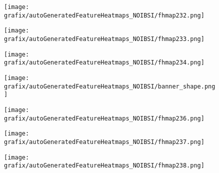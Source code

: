 \hspace{\hsp} 
\begin{subfigure}{\wid\textwidth} 
    \centering 
    \caption{\tiny \sffamily {}} 
    \vspace{\vsp} 
    \texttt{[image: grafix/autoGeneratedFeatureHeatmaps\_NOIBSI/fhmap232.png]} 
\end{subfigure} 
\hspace{\hsp} 
\begin{subfigure}{\wid\textwidth} 
    \centering 
    \caption{\tiny \sffamily {}} 
    \vspace{\vsp} 
    \texttt{[image: grafix/autoGeneratedFeatureHeatmaps\_NOIBSI/fhmap233.png]} 
\end{subfigure} 
\hspace{\hsp} 
\begin{subfigure}{\wid\textwidth} 
    \centering 
    \caption{\tiny \sffamily {}} 
    \vspace{\vsp} 
    \texttt{[image: grafix/autoGeneratedFeatureHeatmaps\_NOIBSI/fhmap234.png]} 
\end{subfigure} 
\hspace{\hsp} 
\begin{subfigure}{\wid\textwidth} 
    \texttt{[image: grafix/autoGeneratedFeatureHeatmaps\_NOIBSI/banner\_shape.png]} 
\end{subfigure} 
\hspace{\hsp} 
\begin{subfigure}{\wid\textwidth} 
    \centering 
    \caption{\tiny \sffamily {}} 
    \vspace{\vsp} 
    \texttt{[image: grafix/autoGeneratedFeatureHeatmaps\_NOIBSI/fhmap236.png]} 
\end{subfigure} 
\hspace{\hsp} 
\begin{subfigure}{\wid\textwidth} 
    \centering 
    \caption{\tiny \sffamily {}} 
    \vspace{\vsp} 
    \texttt{[image: grafix/autoGeneratedFeatureHeatmaps\_NOIBSI/fhmap237.png]} 
\end{subfigure} 
\hspace{\hsp} 
\begin{subfigure}{\wid\textwidth} 
    \centering 
    \caption{\tiny \sffamily {}} 
    \vspace{\vsp} 
    \texttt{[image: grafix/autoGeneratedFeatureHeatmaps\_NOIBSI/fhmap238.png]} 
\end{subfigure} 
